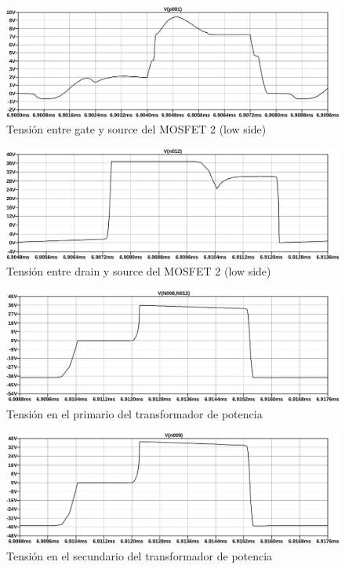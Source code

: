 \begin{figure}[ht]
    \centering
    \includegraphics[width=\textwidth]{images/sim/17.pdf}
    \caption{Tensión entre gate y source del MOSFET 2 (low side)}
    \label{fig:sim:17}
\end{figure}

\begin{figure}[ht]
    \centering
    \includegraphics[width=\textwidth]{images/sim/18.pdf}
    \caption{Tensión entre drain y source del MOSFET 2 (low side)}
    \label{fig:sim:18}
\end{figure}

\begin{figure}[ht]
    \centering
    \includegraphics[width=\textwidth]{images/sim/19.pdf}
    \caption{Tensión en el primario del transformador de potencia}
    \label{fig:sim:19}
\end{figure}

\begin{figure}[ht]
    \centering
    \includegraphics[width=\textwidth]{images/sim/20.pdf}
    \caption{Tensión en el secundario del transformador de potencia}
    \label{fig:sim:20}
\end{figure}

